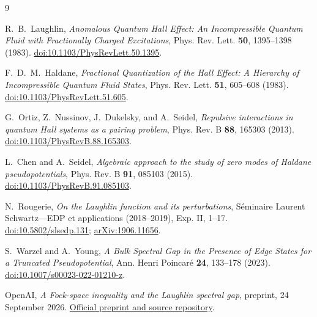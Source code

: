 \documentclass[11pt]{article}
\begin{document}
\begin{thebibliography}{9}

R.~B.~Laughlin,
\emph{Anomalous Quantum Hall Effect: An Incompressible Quantum Fluid with
Fractionally Charged Excitations},
Phys. Rev. Lett. \textbf{50}, 1395--1398 (1983).
\href{https://doi.org/10.1103/PhysRevLett.50.1395}{doi:10.1103/PhysRevLett.50.1395}.

F.~D.~M.~Haldane,
\emph{Fractional Quantization of the Hall Effect: A Hierarchy of
Incompressible Quantum Fluid States},
Phys. Rev. Lett. \textbf{51}, 605--608 (1983).
\href{https://doi.org/10.1103/PhysRevLett.51.605}{doi:10.1103/PhysRevLett.51.605}.

G.~Ortiz, Z.~Nussinov, J.~Dukelsky, and A.~Seidel,
\emph{Repulsive interactions in quantum Hall systems as a pairing problem},
Phys. Rev. B \textbf{88}, 165303 (2013).
\href{https://doi.org/10.1103/PhysRevB.88.165303}{doi:10.1103/PhysRevB.88.165303}.

L.~Chen and A.~Seidel,
\emph{Algebraic approach to the study of zero modes of Haldane pseudopotentials},
Phys. Rev. B \textbf{91}, 085103 (2015).
\href{https://doi.org/10.1103/PhysRevB.91.085103}{doi:10.1103/PhysRevB.91.085103}.

N.~Rougerie,
\emph{On the Laughlin function and its perturbations},
S\'eminaire Laurent Schwartz---EDP et applications (2018--2019),
Exp. II, 1--17.
\href{https://doi.org/10.5802/slsedp.131}{doi:10.5802/slsedp.131};
\href{https://arxiv.org/abs/1906.11656}{arXiv:1906.11656}.

S.~Warzel and A.~Young,
\emph{A Bulk Spectral Gap in the Presence of Edge States for a Truncated
Pseudopotential},
Ann. Henri Poincar\'e \textbf{24}, 133--178 (2023).
\href{https://doi.org/10.1007/s00023-022-01210-z}{doi:10.1007/s00023-022-01210-z}.

OpenAI,
\emph{A Fock-space inequality and the Laughlin spectral gap},
preprint, 24 September 2026.
\href{https://github.com/openai/math/blob/main/preprints/A-Fock-space-inequality-and-the-Laughlin-spectral-gap-September-24-2026/A-Fock-space-inequality-and-the-Laughlin-spectral-gap-September-24-2026.pdf}{Official preprint and source repository}.

\end{thebibliography}
\end{document}

